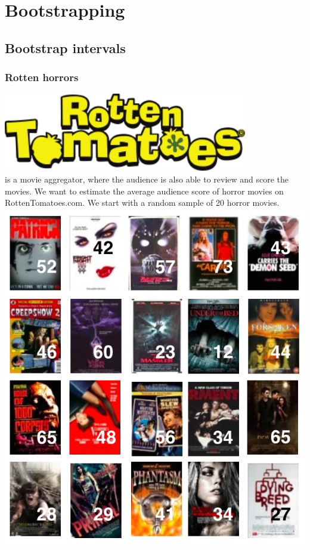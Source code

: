 \documentclass[slidestop,compress,mathserif,12pt,t,professionalfonts,xcolor=table]{beamer}
\begin{document}

\section{Bootstrapping}


\subsection{Bootstrap intervals}


\begin{frame}
\frametitle{Rotten horrors}

{
\includegraphics[width = 0.8\textwidth]{figures/movies/rotten_tomatoes} \\
is a movie aggregator, where the audience is also able to review and score the movies. We want to estimate the average audience score of horror movies on RottenTomatoes.com. We start with a random sample of 20 horror movies.
}
{
\includegraphics[width = \textwidth]{figures/movies/horror_data}
}

\end{frame}
\end{document}
